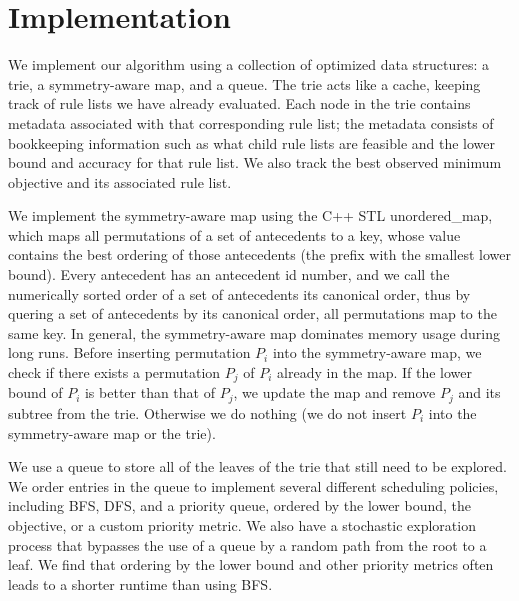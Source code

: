 \section{Implementation}
\label{sec:implementation}



We implement our algorithm using a collection of optimized data structures:
a trie, a symmetry-aware map, and a queue.
The trie acts like a cache, keeping track of rule lists we have already evaluated.
Each node in the trie contains metadata associated with that corresponding rule list;
the metadata consists of bookkeeping information such as what child rule lists are feasible and
the lower bound and accuracy for that rule list.
We also track the best observed minimum objective and its associated rule list.

We implement the symmetry-aware map using the C++ STL unordered\_map, which
maps all permutations of a set of antecedents to a key, whose value
contains the best ordering of those antecedents (\ie the prefix with the smallest lower bound).
Every antecedent has an antecedent id number, and we call the numerically
sorted order of a set of antecedents its canonical order, thus
by quering a set of antecedents by its canonical order, all
permutations map to the same key.
%
%
In general, the symmetry-aware map dominates memory usage during long runs.
Before inserting permutation $P_i$ into the symmetry-aware map, we check
if there exists a permutation $P_j$ of $P_i$ already in the map.
If the lower bound of $P_i$ is better than that of $P_j$,
we update the map and remove $P_j$ and its subtree from the trie.
Otherwise we do nothing (\ie we do not insert $P_i$ into the symmetry-aware map
or the trie).

We use a queue to store all of the leaves of the trie that still need to be explored.
We order entries in the queue to implement several different scheduling policies,
including BFS, DFS, and a priority queue, ordered by the lower bound, the objective,
or a custom priority metric.
We also have a stochastic exploration process that bypasses the use of a queue by
a random path from the root to a leaf.
We find that ordering by the lower bound and other priority metrics
often leads to a shorter runtime than using BFS.

